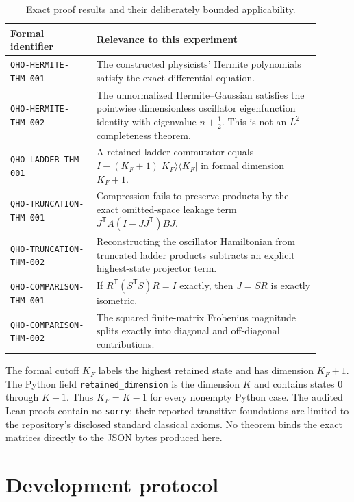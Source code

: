 \documentclass[11pt]{article}
\newcommand{\code}[1]{\texttt{#1}}
\begin{document}
\begin{table}[ht]
\centering
\small
\begin{tabular}{@{}p{0.25\linewidth}p{0.65\linewidth}@{}}
\toprule
Formal identifier & Relevance to this experiment \\
\midrule
\code{QHO-HERMITE-THM-001} & The constructed physicists' Hermite polynomials satisfy
the exact differential equation. \\
\code{QHO-HERMITE-THM-002} & The unnormalized Hermite--Gaussian satisfies the
pointwise dimensionless oscillator eigenfunction identity with eigenvalue
$n+\tfrac12$.  This is not an $L^2$ completeness theorem. \\
\code{QHO-LADDER-THM-001} & A retained ladder commutator equals
$I-(K_{\!F}+1)|K_{\!F}\rangle\langle K_{\!F}|$ in formal dimension $K_{\!F}+1$. \\
\code{QHO-TRUNCATION-THM-001} & Compression fails to preserve products by the exact
omitted-space leakage term $J^{\mathsf T}A(I-JJ^{\mathsf T})BJ$. \\
\code{QHO-TRUNCATION-THM-002} & Reconstructing the oscillator Hamiltonian from
truncated ladder products subtracts an explicit highest-state projector term. \\
\code{QHO-COMPARISON-THM-001} & If
$R^{\mathsf T}(S^{\mathsf T}S)R=I$ exactly, then $J=SR$ is exactly isometric. \\
\code{QHO-COMPARISON-THM-002} & The squared finite-matrix Frobenius magnitude splits
exactly into diagonal and off-diagonal contributions. \\
\bottomrule
\end{tabular}
\caption{Exact proof results and their deliberately bounded applicability.}
\label{tab:formal-crosswalk}
\end{table}

The formal cutoff $K_{\!F}$ labels the highest retained state and has dimension
$K_{\!F}+1$.  The Python field \code{retained\_dimension} is the dimension $K$ and
contains states $0$ through $K-1$.  Thus $K_{\!F}=K-1$ for every nonempty Python case.
The audited Lean proofs contain no \code{sorry}; their reported transitive foundations
are limited to the repository's disclosed standard classical axioms.  No theorem binds
the exact matrices directly to the JSON bytes produced here.

\section{Development protocol}
\end{document}
